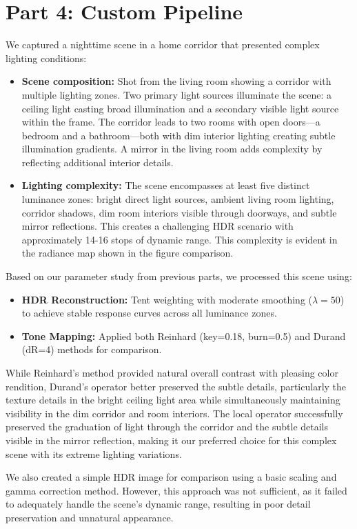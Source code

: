 \documentclass[a4paper,10pt]{article}
\begin{document}
\section{Part 4: Custom Pipeline}
We captured a nighttime scene in a home corridor that presented complex lighting conditions:
\begin{itemize}
    \item \textbf{Scene composition:} Shot from the living room showing a corridor with multiple lighting zones. Two primary light sources illuminate the scene: a ceiling light casting broad illumination and a secondary visible light source within the frame. The corridor leads to two rooms with open doors—a bedroom and a bathroom—both with dim interior lighting creating subtle illumination gradients. A mirror in the living room adds complexity by reflecting additional interior details.
    
    \item \textbf{Lighting complexity:} The scene encompasses at least five distinct luminance zones: bright direct light sources, ambient living room lighting, corridor shadows, dim room interiors visible through doorways, and subtle mirror reflections. This creates a challenging HDR scenario with approximately 14-16 stops of dynamic range. This complexity is evident in the radiance map shown in the figure comparison.
\end{itemize}

Based on our parameter study from previous parts, we processed this scene using:
\begin{itemize}
    \item \textbf{HDR Reconstruction:} Tent weighting with moderate smoothing (\(\lambda=50\)) to achieve stable response curves across all luminance zones.
    \item \textbf{Tone Mapping:} Applied both Reinhard (key=0.18, burn=0.5) and Durand (dR=4) methods for comparison.
\end{itemize}

While Reinhard's method provided natural overall contrast with pleasing color rendition, Durand's operator better preserved the subtle details, particularly the texture details in the bright ceiling light area while simultaneously maintaining visibility in the dim corridor and room interiors. The local operator successfully preserved the graduation of light through the corridor and the subtle details visible in the mirror reflection, making it our preferred choice for this complex scene with its extreme lighting variations.

We also created a simple HDR image for comparison using a basic scaling and gamma correction method. However, this approach was not sufficient, as it failed to adequately handle the scene's dynamic range, resulting in poor detail preservation and unnatural appearance.
\end{document}
